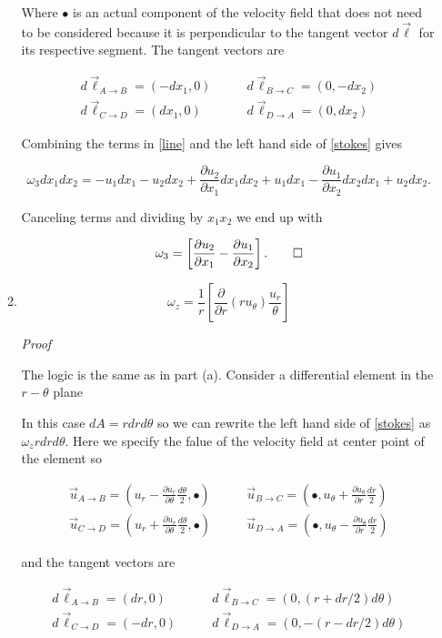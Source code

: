 \documentclass[11pt,twoside]{article}
\newcommand{\p}[2]{\frac{\partial#1}{\partial#2}}
\newcommand{\vect}[1]{\vec{#1}}
\begin{document}
\begin{enumerate}
\begin{enumerate}
Where $\bullet$ is an actual component of the velocity field that does not need to be considered because it is perpendicular to the tangent vector $d\vect{\ell}$ for its respective segment. The tangent vectors are

\begin{align*}
d\vect{\ell}_{A\rightarrow B} = (-dx_1, 0)\quad&\quad d\vect{\ell}_{B\rightarrow C} = (0, -dx_2)\\
d\vect{\ell}_{C\rightarrow D} = (dx_1,0) \quad&\quad d\vect{\ell}_{D\rightarrow A} = (0,dx_2)
\end{align*}

Combining the terms in \autoref{line} and the left hand side of \autoref{stokes} gives

$$\omega_3dx_1dx_2 = -u_1dx_1 - u_2dx_2 + \p{u_2}{x_1}dx_1dx_2 +  u_1dx_1-\p{u_1}{x_2}dx_2dx_1 + u_2dx_2.$$

Canceling terms and dividing by $x_1x_2$ we end up with

$$\omega_3 =  \left[\p{u_2}{x_1}-\p{u_1}{x_2}\right].\qed$$
	
\item	

$$\omega_z=\frac{1}{r}\left[\p{}{r}(ru_\theta)\frac{u_r}{\theta}\right]$$

\textit{Proof}

The logic is the same as in part (a). Consider a differential element in the $r-\theta$ plane



In this case $dA=rdrd\theta$ so we can rewrite the left hand side of \autoref{stokes} as $\omega_zrdrd\theta$.  Here we specify the falue of the velocity field at center point of the element so 

\begin{align*}
\vect{u}_{A\rightarrow B} = \left(u_r-\p{u_r}{\theta}\frac{d\theta}{2}, \bullet\right)\quad&\quad\vect{u}_{B\rightarrow C} = \left(\bullet, u_\theta+\p{u_\theta}{r}\frac{dr}{2}\right)\\
\vect{u}_{C\rightarrow D} = \left(u_r+\p{u_r}{\theta}\frac{d\theta}{2}, \bullet\right) \quad&\quad\vect{u}_{D\rightarrow A} = \left(\bullet,u_\theta-\p{u_\theta}{r}\frac{dr}{2}\right)
\end{align*}

and the tangent vectors are

\begin{align*}
d\vect{\ell}_{A\rightarrow B} = (dr, 0)\quad&\quad d\vect{\ell}_{B\rightarrow C} = (0, (r+dr/2)d\theta)\\
d\vect{\ell}_{C\rightarrow D} = (-dr,0) \quad&\quad d\vect{\ell}_{D\rightarrow A} = (0,-(r-dr/2)d\theta)
\end{align*}


\end{enumerate}
\end{enumerate}
\end{document}
